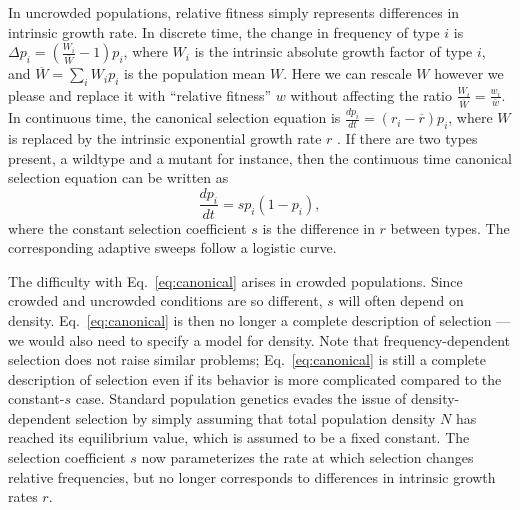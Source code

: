 \documentclass[11pt]{article}
\begin{document}
In uncrowded populations, relative fitness simply represents differences in intrinsic growth rate. In discrete time, the change in frequency of type $i$ is $\Delta p_i=\left(\frac{W_i}{\overline{W}}-1\right) p_i$, where $W_i$ is the intrinsic absolute growth factor of type $i$, and $\overline{W}=\sum_i W_i p_i$ is the population mean $W$. Here we can rescale $W$ however we please and replace it with ``relative fitness'' $w$ without affecting the ratio $\frac{W_i}{\overline{W}}=\frac{w_i}{\overline{w}}$. In continuous time, the canonical selection equation is $\frac{d p_i}{dt}=(r_i-\overline{r}) p_i$, where $W$ is replaced by the intrinsic exponential growth rate $r$ \citep[pp. 26]{crow_1970}. If there are two types present, a wildtype and a mutant for instance, then the continuous time canonical selection equation can be written as
\begin{equation}
\frac{d p_i}{dt}=s p_i(1-p_i), \label{eq:canonical}
\end{equation}
where the constant selection coefficient $s$ is the difference in $r$ between types. The corresponding adaptive sweeps follow a logistic curve. 

The difficulty with Eq.~\eqref{eq:canonical} arises in crowded populations. Since crowded and uncrowded conditions are so different, $s$ will often depend on density. Eq.~\eqref{eq:canonical} is then no longer a complete description of selection --- we would also need to specify a model for density. Note that frequency-dependent selection does not raise similar problems; Eq.~\eqref{eq:canonical} is still a complete description of selection even if its behavior is more complicated compared to the constant-$s$ case. Standard population genetics evades the issue of density-dependent selection by simply assuming that total population density $N$ has reached its equilibrium value, which is assumed to be a fixed constant. The selection coefficient $s$ now parameterizes the rate at which selection changes relative frequencies, but no longer corresponds to differences in intrinsic growth rates $r$. 
\end{document}

